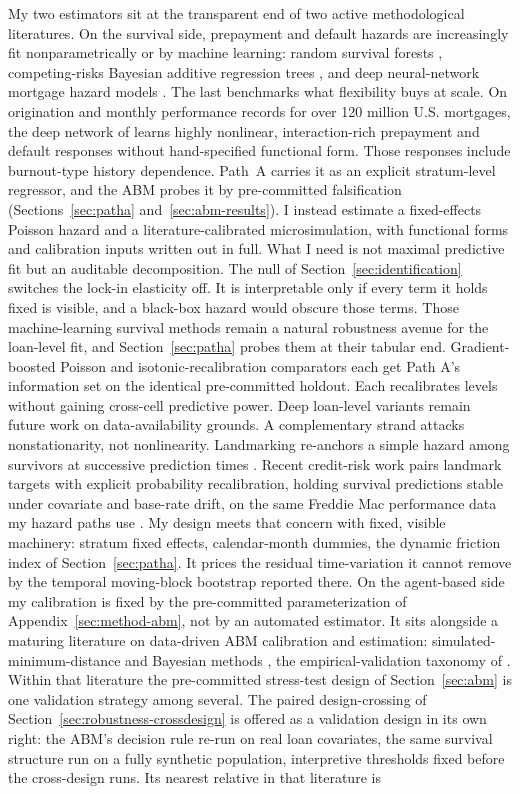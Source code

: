 \documentclass[12pt]{article}
\begin{document}
My two estimators sit at the transparent end of two active methodological literatures. On the survival side, prepayment and default hazards are increasingly fit nonparametrically or by machine learning: random survival forests \citep{ishwaran2008}, competing-risks Bayesian additive regression trees \citep{sparapani2020}, and deep neural-network mortgage hazard models \citep{sadhwani2021}. The last benchmarks what flexibility buys at scale. On origination and monthly performance records for over 120 million U.S. mortgages, the deep network of \citet{sadhwani2021} learns highly nonlinear, interaction-rich prepayment and default responses without hand-specified functional form. Those responses include burnout-type history dependence. Path~A carries it as an explicit stratum-level regressor, and the ABM probes it by pre-committed falsification (Sections~\ref{sec:patha} and~\ref{sec:abm-results}). I instead estimate a fixed-effects Poisson hazard and a literature-calibrated microsimulation, with functional forms and calibration inputs written out in full. What I need is not maximal predictive fit but an auditable decomposition. The null of Section~\ref{sec:identification} switches the lock-in elasticity off. It is interpretable only if every term it holds fixed is visible, and a black-box hazard would obscure those terms. Those machine-learning survival methods remain a natural robustness avenue for the loan-level fit, and Section~\ref{sec:patha} probes them at their tabular end. Gradient-boosted Poisson and isotonic-recalibration comparators each get Path A's information set on the identical pre-committed holdout. Each recalibrates levels without gaining cross-cell predictive power. Deep loan-level variants remain future work on data-availability grounds. A complementary strand attacks nonstationarity, not nonlinearity. Landmarking re-anchors a simple hazard among survivors at successive prediction times \citep{vanhouwelingen2007,putter2022}. Recent credit-risk work pairs landmark targets with explicit probability recalibration, holding survival predictions stable under covariate and base-rate drift, on the same Freddie Mac performance data my hazard paths use \citep{peng2026}. My design meets that concern with fixed, visible machinery: stratum fixed effects, calendar-month dummies, the dynamic friction index of Section~\ref{sec:patha}. It prices the residual time-variation it cannot remove by the temporal moving-block bootstrap reported there. On the agent-based side my calibration is fixed by the pre-committed parameterization of Appendix~\ref{sec:method-abm}, not by an automated estimator. It sits alongside a maturing literature on data-driven ABM calibration and estimation: simulated-minimum-distance and Bayesian methods \citep{grazzini2017,platt2020}, the empirical-validation taxonomy of \citet{fagiolo2007}. Within that literature the pre-committed stress-test design of Section~\ref{sec:abm} is one validation strategy among several. The paired design-crossing of Section~\ref{sec:robustness-crossdesign} is offered as a validation design in its own right: the ABM's decision rule re-run on real loan covariates, the same survival structure run on a fully synthetic population, interpretive thresholds fixed before the cross-design runs. Its nearest relative in that literature is 
\end{document}
